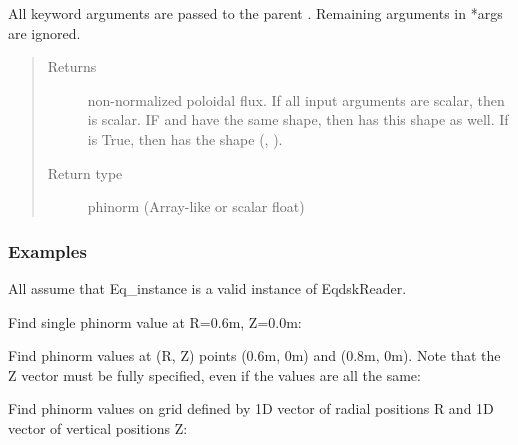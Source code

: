 \documentclass[letterpaper,10pt,english]{sphinxmanual}
\begin{document}
\begin{fulllineitems}
\begin{fulllineitems}
All keyword arguments are passed to the parent
{\hyperref[\detokenize{eqtools:eqtools.core.Equilibrium.rz2phinorm}]{}}.
Remaining arguments in *args are ignored.
\begin{quote}\begin{description}
\item[{Returns}] \leavevmode
non-normalized poloidal flux.  If
all input arguments are scalar, then  is scalar.  IF  and 
have the same shape, then  has this shape as well.  If 
is True, then  has the shape (, ).

\item[{Return type}] \leavevmode
phinorm (Array-like or scalar float)

\end{description}\end{quote}
\subsubsection*{Examples}

All assume that Eq\_instance is a valid instance of EqdskReader.

Find single phinorm value at R=0.6m, Z=0.0m:

\begin{sphinxVerbatim}[commandchars=\\\{\}]
   
\end{sphinxVerbatim}

Find phinorm values at (R, Z) points (0.6m, 0m) and (0.8m, 0m).
Note that the Z vector must be fully specified,
even if the values are all the same:

\begin{sphinxVerbatim}[commandchars=\\\{\}]
  \PYG{p}{[} \PYG{p}{]} \PYG{p}{[} \PYG{p}{]}
\end{sphinxVerbatim}

Find phinorm values on grid defined by 1D vector of radial positions
R and 1D vector of vertical positions Z:


\end{fulllineitems}
\end{fulllineitems}
\end{document}
